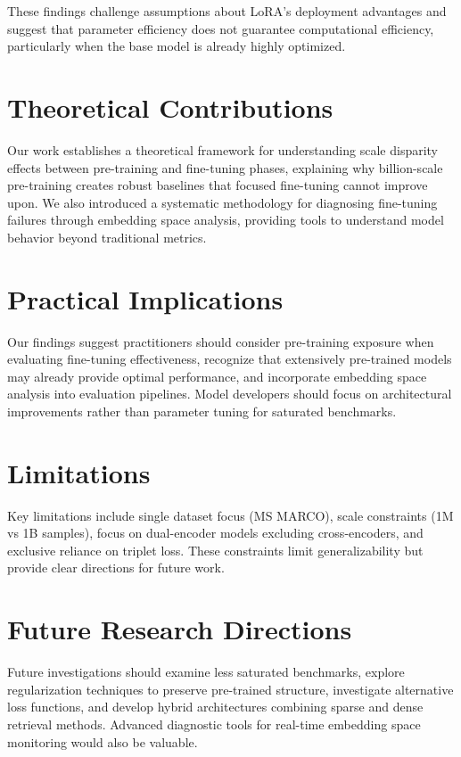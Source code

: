 These findings challenge assumptions about LoRA's deployment advantages and suggest that parameter efficiency does not guarantee computational efficiency, particularly when the base model is already highly optimized.

\section{Theoretical Contributions}

Our work establishes a theoretical framework for understanding scale disparity effects between pre-training and fine-tuning phases, explaining why billion-scale pre-training creates robust baselines that focused fine-tuning cannot improve upon. We also introduced a systematic methodology for diagnosing fine-tuning failures through embedding space analysis, providing tools to understand model behavior beyond traditional metrics.

\section{Practical Implications}

Our findings suggest practitioners should consider pre-training exposure when evaluating fine-tuning effectiveness, recognize that extensively pre-trained models may already provide optimal performance, and incorporate embedding space analysis into evaluation pipelines. Model developers should focus on architectural improvements rather than parameter tuning for saturated benchmarks.

\section{Limitations}

Key limitations include single dataset focus (MS MARCO), scale constraints (1M vs 1B samples), focus on dual-encoder models excluding cross-encoders, and exclusive reliance on triplet loss. These constraints limit generalizability but provide clear directions for future work.

\section{Future Research Directions}

Future investigations should examine less saturated benchmarks, explore regularization techniques to preserve pre-trained structure, investigate alternative loss functions, and develop hybrid architectures combining sparse and dense retrieval methods. Advanced diagnostic tools for real-time embedding space monitoring would also be valuable.

